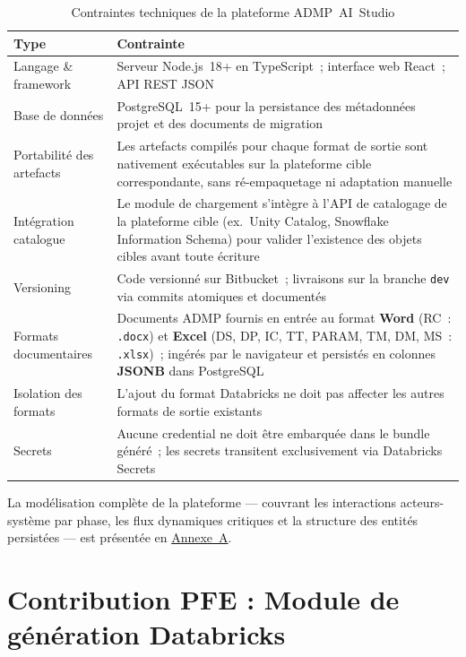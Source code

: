 \begin{table}[H]
\centering
\caption{Contraintes techniques de la plateforme ADMP~AI~Studio}
\label{tab:ct}
\begin{tabularx}{\textwidth}{p{4cm}X}
\toprule
\textbf{Type} & \textbf{Contrainte} \\
\midrule
Langage \& framework &
  Serveur Node.js~18+ en TypeScript~; interface web React~; API REST JSON \\
\addlinespace
Base de données &
  PostgreSQL~15+ pour la persistance des métadonnées projet et des documents de migration \\
\addlinespace
Portabilité des artefacts &
  Les artefacts compilés pour chaque format de sortie sont nativement exécutables sur la plateforme cible correspondante, sans ré-empaquetage ni adaptation manuelle \\
\addlinespace
Intégration catalogue &
  Le module de chargement s'intègre à l'API de catalogage de la plateforme cible (ex.~Unity Catalog, Snowflake Information Schema) pour valider l'existence des objets cibles avant toute écriture \\
\addlinespace
Versioning &
  Code versionné sur Bitbucket~; livraisons sur la branche \texttt{dev} via commits atomiques et documentés \\
\addlinespace
Formats documentaires &
  Documents ADMP fournis en entrée au format \textbf{Word} (RC~: \texttt{.docx}) et \textbf{Excel} (DS, DP, IC, TT, PARAM, TM, DM, MS~: \texttt{.xlsx})~; ingérés par le navigateur et persistés en colonnes \textbf{JSONB} dans PostgreSQL \\
\addlinespace
Isolation des formats &
  L'ajout du format Databricks ne doit pas affecter les autres formats de sortie existants \\
\addlinespace
Secrets &
  Aucune credential ne doit être embarquée dans le bundle généré~; les secrets transitent exclusivement via Databricks Secrets \\
\bottomrule
\end{tabularx}
\end{table}

La modélisation complète de la plateforme --- couvrant les interactions acteurs-système par phase, les flux dynamiques critiques et la structure des entités persistées --- est présentée en \hyperref[annexe:uml]{Annexe~A}.

\section{Contribution PFE : Module de génération Databricks}
\label{sec:contribution-databricks}

